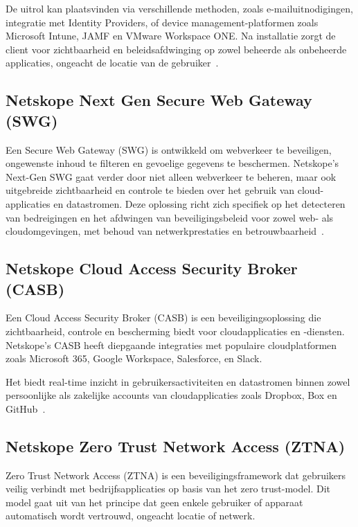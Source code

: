 De uitrol kan plaatsvinden via verschillende methoden, zoals e-mailuitnodigingen, integratie met Identity Providers, of device management-platformen zoals Microsoft Intune, JAMF en VMware Workspace ONE. Na installatie zorgt de client voor zichtbaarheid en beleidsafdwinging op zowel beheerde als onbeheerde applicaties, ongeacht de locatie van de gebruiker~\autocite{Netskope2025-8}.

\subsection{Netskope Next Gen Secure Web Gateway (SWG)}
Een Secure Web Gateway (SWG) is ontwikkeld om webverkeer te beveiligen, ongewenste inhoud te filteren en gevoelige gegevens te beschermen. Netskope's Next-Gen SWG gaat verder door niet alleen webverkeer te beheren, maar ook uitgebreide zichtbaarheid en controle te bieden over het gebruik van cloud-applicaties en datastromen.
Deze oplossing richt zich specifiek op het detecteren van bedreigingen en het afdwingen van beveiligingsbeleid voor zowel web- als cloudomgevingen, met behoud van netwerkprestaties en betrouwbaarheid~\autocite{Netskope2025-3}.

\subsection{Netskope Cloud Access Security Broker (CASB)}
Een Cloud Access Security Broker (CASB) is een beveiligingsoplossing die zichtbaarheid, controle en bescherming biedt voor cloudapplicaties en -diensten. Netskope's CASB heeft diepgaande integraties met populaire cloudplatformen zoals Microsoft 365, Google Workspace, Salesforce, en Slack.

\vspace{2ex}

Het biedt real-time inzicht in gebruikersactiviteiten en datastromen binnen zowel persoonlijke als zakelijke accounts van cloudapplicaties zoals Dropbox, Box en GitHub~\autocite{Netskope2025-4}.

\subsection{Netskope Zero Trust Network Access (ZTNA)}
Zero Trust Network Access (ZTNA) is een beveiligingsframework dat gebruikers veilig verbindt met bedrijfsapplicaties op basis van het zero trust-model. Dit model gaat uit van het principe dat geen enkele gebruiker of apparaat automatisch wordt vertrouwd, ongeacht locatie of netwerk. 

